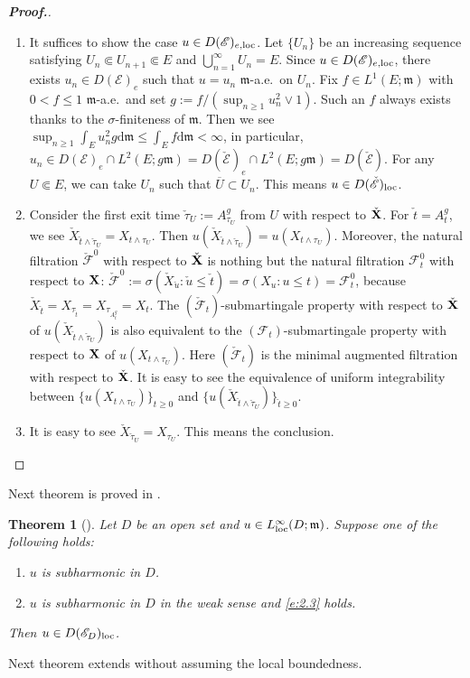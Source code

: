 \documentclass[12pt,a4paper]{article}
\newtheorem{thm}{Theorem}[section]
\renewcommand{\d}{\mathrm{d}}
\newcommand{\m}{\mathfrak{m} }
\newcommand{\loc}{{\rm loc}}
\newcommand{\1}{{\bf 1}}
\begin{document}
 \begin{proof}[\bf Proof.]
 \begin{enumerate}
 \item[(1)] It suffices to show the case $u\in D(\mathscr{E})_{e,\loc}$. 
 Let $\{U_n\}$ be an increasing sequence satisfying $U_n\Subset U_{n+1}\Subset E$ and $\bigcup_{n=1}^{\infty}U_n=E$. 
 Since $u\in D(\mathscr{E})_{e,\loc}$, there exists $u_n\in D(\mathscr{E})_e$ such that $u=u_n$ ${\m}$-a.e.~on $U_n$. Fix $f\in L^1(E;{\m})$ with $0<f\leq 1$ ${\m}$-a.e.~and set $g:=f/(\sup_{n\geq1}u_n^2\lor 1)$. 
 Such an $f$ always exists thanks to the $\sigma$-finiteness of ${\m}$. Then we see 
 $\sup_{n\geq1}\int_Eu_n^2g{\d}{\m}\leq\int_Ef{\d}{\m}<\infty$, in particular, 
 $u_n\in D(\mathscr{E})_e\cap L^2(E;g{\m})=D(\check{\mathscr{E}})_e\cap L^2(E;g{\m})=D(\check{\mathscr{E}})$. For any $U\Subset E$, we can take 
 $U_n$ such that $\overline{U}\subset U_n$. This means $u\in D(\check{\mathscr{E}})_{\loc}$. 
 \item[(2)] Consider the first exit time 
 $\check{\tau}_U:=A_{\tau_U}^g$ from $U$ with respect to $\check{\bf X}$. 
 For $\check{t}=A_t^g$, we see $\check{X}_{\check{t}\land \check{\tau}_U}=X_{t\land \tau_U}$. Then $u(\check{X}_{\check{t}\land \check{\tau}_U})=u(X_{t\land \tau_U})$.
 Moreover, the natural filtration $\check{\mathscr{F}}^0$ with respect to $\check{\bf X}$ is nothing but the natural filtration 
  $\mathscr{F}_t^0$ with respect to ${\bf X}$:
 $\check{\mathscr{F}}^0:=\sigma(\check{X}_{\check{u}}:\check{u}\leq\check{t})
 =\sigma(X_u:u\leq t)=\mathscr{F}_t^0$, because $\check{X}_{\check{t}}=X_{\tau_{\check{t}}}=X_{\tau_{A_t^g}}=X_t$.  
 The $(\check{\mathscr{F}}_t)$-submartingale property with respect to $\check{\bf X}$ of $u(\check{X}_{\check{t}\land \check{\tau}_U})$ is also equivalent to the $({\mathscr{F}}_t)$-submartingale property with respect to ${\bf X}$ of $u(X_{t\land \tau_U})$. Here $(\check{\mathscr{F}}_t)$ is the minimal augmented filtration with respect to $\check{\bf X}$. 
 It is easy to see the equivalence of uniform integrability between 
 $\{u(X_{t\land\tau_U})\}_{t\geq0}$ and $\{u(\check{X}_{\check{t}\land\check{\tau}_U})\}_{\check{t}\geq0}$. 
 \item[(3)] It is easy to see $\check{X}_{\check{\tau}_U}=X_{\tau_U}$. 
 This means the conclusion. 
\end{enumerate}
 \end{proof}
Next theorem is proved in \cite[Theorem~3.11]{CK}. 
\begin{thm}[{\cite[Theorem~3.11]{CK}}]\label{thm:Domain}
Let $D$ be an open set and $u\in L^{\infty}_{\loc}(D;{\m})$. Suppose one of the following holds:
\begin{enumerate}
\item[\rm(1)] $u$ is subharmonic in $D$.
\item[\rm(2)] $u$ is subharmonic in $D$ in the weak sense and \eqref{e:2.3} holds. 
\end{enumerate} 
Then $u\in D(\mathscr{E}_D)_{\loc}$. 
\end{thm}
Next theorem extends \cite[Theorem~3.12]{CK} without assuming 
the local boundedness. 
\end{document}
